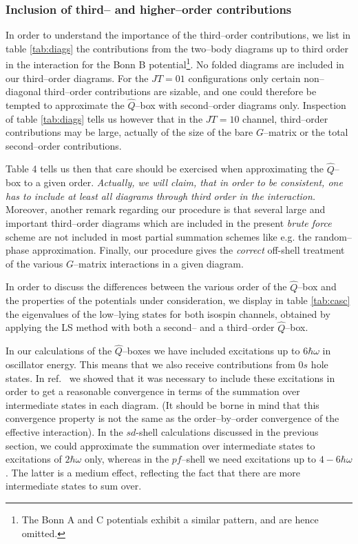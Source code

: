 \subsubsection{Inclusion of third--  and higher--order contributions}
In order to understand the importance of the third--order contributions,
we list in table
\ref{tab:diags}  the contributions from the two--body
diagrams up to third order in the interaction for the Bonn B
potential\footnote{The Bonn A and C potentials exhibit a similar pattern, and are
hence omitted.}.
No folded diagrams
are included in our third--order diagrams. 
For the $JT=01$ configurations only certain non--diagonal third--order 
contributions are sizable, and one could therefore be tempted to approximate
the $\hat{Q}$--box with second--order diagrams only. Inspection of 
table \ref{tab:diags} tells us however that in the $JT=10$ channel, third--order
contributions may be large, actually of the size of the bare $G$--matrix or the
total second--order contributions. 

Table 4 tells us then that care should be exercised when approximating the
$\hat{Q}$--box to a given order. {\em Actually, we will claim, that in order to be
consistent, one has to include at least all diagrams through third order
in the interaction.} Moreover, another remark regarding our procedure is that several
large and important third--order diagrams which are included in the 
present {\em brute force} scheme are not included in most partial summation schemes
like e.g. the random--phase approximation. Finally, our procedure gives the
{\em correct} off-shell treatment of the various $G$--matrix interactions in a given
diagram.  

In order to discuss the differences between the various order of the $\hat{Q}$--box
and the properties of the potentials under consideration, we display
in table \ref{tab:casc} the eigenvalues of the low--lying
states for both isospin channels, obtained by applying the LS method
with both a second-- and a third--order $\hat{Q}$--box.  

In our calculations of the $\hat{Q}$--boxes we have included 
excitations up to $6\hbar\omega$ in oscillator energy. This means that 
we also receive contributions from $0s$ hole states. In ref.\ \cite{heho92} 
we showed that it was necessary to include these excitations in order
to get a reasonable convergence in terms of the summation over intermediate
states in each diagram. (It should be borne in mind that this convergence
property is not the same as the order--by--order convergence of the effective
interaction). In the $sd$-shell calculations discussed in the previous section, we 
could approximate the summation over intermediate states to excitations of 
$2\hbar\omega$ only, whereas in the $pf$--shell we need excitations up to
$4-6\hbar\omega$. The latter is a medium effect, reflecting the fact that 
there are more intermediate states to sum over. 


